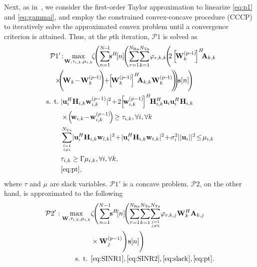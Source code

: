 \documentclass[conference,twocolumn,a4paper]{IEEEtran}
\theoremstyle{remark} \newtheorem{remark}{Remark}
\begin{document}
Next, as in~\cite{art:paperRFVLC}, we consider the first-order Taylor approximation to linearize \eqref{eq:p1} and \eqref{eq:gammai}, and employ the constrained convex-concave procedure (CCCP) to iteratively solve the approximated convex problem until a convergence criterion is attained. Thus, at the $p$th iteration, $\mathcal{P}1$ is solved as
\begin{subequations}
\begin{align}
\mathcal{P}1'&\!:\! \max_{\mathbf{W}, \tau_{i,k}, \mu_{i,k}}\!\! \zeta\!\Bigg(\!\sum_{n=1}^{N\!-\!1}\!\!\mathbf{s}^H\![n]\!\Bigg(\!\sum_{r=1}^{N_{\mathrm{Rx}}}\! \sum_{k=1}^{N_{\mathrm{Tx}}}\! \varphi_{r,k,k}\!\Bigg(\!\!2\left[\!\mathbf{W}_k^{(p\!-\!1)}\!\right]^H\!\!\!\mathbf{A}_{k,k}\nonumber\\
\!\times&\!\!\Bigg(\!\mathbf{W}_k\!-\!\mathbf{W}_k^{(p\!-\!1)}\!\!\Bigg)\!\!+\!\!
\left[\!\mathbf{W}_k^{(p\!-\!1)}\!\right]^H\!\!\!\mathbf{A}_{k,k}\mathbf{W}_k^{(p\!-\!1)}\!\Bigg)\!\!\!\Bigg)\!\mathbf{s}[n]\!\Bigg)\label{eq:p1linha}\\
\text { s. t. }\!&|\mathbf{u}_i^H\mathbf{H}_{i,k}\mathbf{w}_{i,k}^{(p-1)}|^2\!+\!2\!\left[\!\mathbf{w}_{i,k}^{(p-1)}\!\right]^H\!\!\mathbf{H}_{i,k}^H\mathbf{u}_i\mathbf{u}_i^H\mathbf{H}_{i,k}\nonumber\\
&\times\!\left(\!\mathbf{w}_{i,k}\!-\!\mathbf{w}_{i,k}^{(p-1)}\!\right)\!\geq \tau_{i,k}, \forall i, \forall k\label{eq:SINR1}\\
&\sum_{l=1 \atop l \neq i}^{N_{\mathrm{Ue}}}\!|\mathbf{u}_i^H\mathbf{H}_{i,k}\mathbf{w}_{l,k}|^2\!+\!|\mathbf{u}_i^H\mathbf{H}_{i,k}\mathbf{w}_{t,k}|^2\!+\!\sigma^2_i||\mathbf{u}_i||^2\!\leq\!\mu_{i,k}\label{eq:SINR2}\\
&\tau_{i,k} \geq \Gamma \mu_{i,k}, \forall i, \forall k,\label{eq:slack}\\
&\eqref{eq:pt},\nonumber 
\end{align}
\end{subequations}
where $\tau$ and $\mu$ are slack variables. $\mathcal{P}1'$ is a concave problem. 
$\mathcal{P}2$, on the other hand, is approximated to the following
\begin{subequations}
\begin{align}
\mathcal{P}2': \max_{\mathbf{W}, \tau_{i,k},\mu_{i,k}} &\zeta\!\Bigg(\!\sum_{n=1}^{N-1}\!\!\mathbf{s}^H\![n]\!\Bigg(\!\sum_{r=1}^{N_{\mathrm{Rx}}}\! \sum_{k=1}^{N_{\mathrm{Tx}}}\! \sum_{j=1 \atop j \neq k}^{N_{\mathrm{Tx}}}\! \varphi_{r,k,j}\mathbf{W}_k^H\mathbf{A}_{k,j}\nonumber\\&\times\mathbf{W}_j^{(p-1)}\Bigg)\mathbf{s}[n]\Bigg)\label{eq:p21}\\
\text { s. t. } & \eqref{eq:SINR1}, \eqref{eq:SINR2},\eqref{eq:slack}, \eqref{eq:pt}.\nonumber 
\end{align}
\end{subequations}
\end{document}
